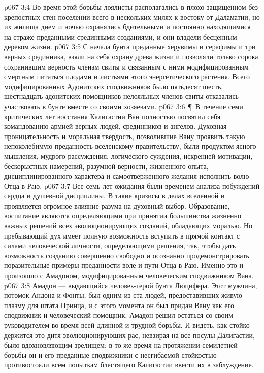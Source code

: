 \vs p067 3:4 Во время этой борьбы лоялисты располагались в плохо защищенном без крепостных стен поселении всего в нескольких милях к востоку от Даламатии, но их жилища днем и ночью охранялись бдительными и постоянно находящимися на страже преданными срединными созданиями, и они владели бесценным деревом жизни.
\vs p067 3:5 С начала бунта преданные херувимы и серафимы и три верных срединника, взяли на себя охрану древа жизни и позволяли только сорока сохранившим верность членам свиты и связанным с ними модифицированным смертным питаться плодами и листьями этого энергетического растения. Всего модифицированных Адонитских сподвижников было пятьдесят шесть, шестнадцать адонитских помощников нелояльных членов свиты отказались участвовать в бунте вместе со своими хозяевами.
\vs p067 3:6 \P\ В течение семи критических лет восстания Калигастии Ван полностью посвятил себя командованию армией верных людей, срединников и ангелов. Духовная проницательность и моральная твердость, позволившие Вану проявить такую непоколебимую преданность вселенскому правительству, были продуктом ясного мышления, мудрого рассуждения, логического суждения, искренней мотивации, бескорыстных намерений, разумной верности, жизненного опыта, дисциплинированного характера и самоотверженного желания исполнить волю Отца в Раю.
\vs p067 3:7 Все семь лет ожидания были временем анализа побуждений сердца и душевной дисциплины. В такие кризисы в делах вселенной и проявляется огромное влияние разума на духовный выбор. Образование, воспитание являются определяющими при принятии большинства жизненно важных решений всех эволюционирующих созданий, обладающих моралью. Но пребывающий дух имеет полную возможность вступить в прямой контакт с силами человеческой личности, определяющими решения, так, чтобы дать возможность созданию совершенно свободно и осознанно продемонстрировать поразительные примеры преданности воле и пути Отца в Раю. Именно это и произошло с Амадоном, модифицированным человеческим сподвижником Вана.
\vs p067 3:8 Амадон --- выдающийся человек\hyp{}герой бунта Люцифера. Этот мужчина, потомок Андона и Фонты, был одним из ста людей, предоставивших живую плазму для штата Принца, и с этого момента он был придан Вану как его сподвижник и человеческий помощник. Амадон решил остаться со своим руководителем во время всей длинной и трудной борьбы. И видеть, как стойко держится это дитя эволюционирующих рас, невзирая на все посулы Далигастии, было вдохновляющим зрелищем; в то же время на протяжении семилетней борьбы он и его преданные сподвижники с несгибаемой стойкостью противостояли всем попыткам блестящего Калигастии ввести их в заблуждение.

